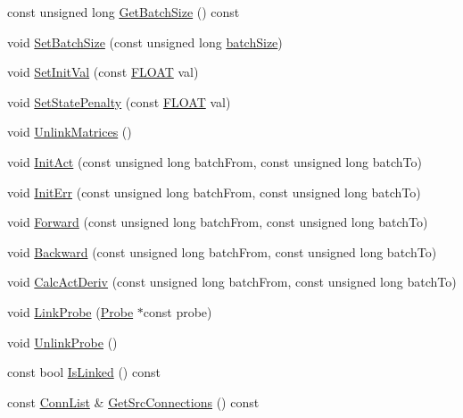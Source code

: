 \begin{DoxyCompactItemize}
\item 
const unsigned long \hyperlink{classfractal_1_1Layer_ad1e9cb194a5ad8ea269857b2f16e001b}{Get\+Batch\+Size} () const 
\item 
void \hyperlink{classfractal_1_1Layer_af2dd6884fc31a42299d200e6c872e67f}{Set\+Batch\+Size} (const unsigned long \hyperlink{classfractal_1_1Layer_ab1bc36200fdb731ad1142d1dc96a6031}{batch\+Size})
\item 
void \hyperlink{classfractal_1_1Layer_a48def7f0cfc273b4b56c52d8d73670b6}{Set\+Init\+Val} (const \hyperlink{namespacefractal_a1c2d2530689575d5ccb56bae52af70d3}{F\+L\+O\+A\+T} val)
\item 
void \hyperlink{classfractal_1_1Layer_a0c698b46cbbf0b8c3cc58605dfcbf21c}{Set\+State\+Penalty} (const \hyperlink{namespacefractal_a1c2d2530689575d5ccb56bae52af70d3}{F\+L\+O\+A\+T} val)
\item 
void \hyperlink{classfractal_1_1Layer_af834c8d49a9c2edffd2652b4ae344aa9}{Unlink\+Matrices} ()
\item 
void \hyperlink{classfractal_1_1Layer_a9e26171500b461c31e56f34debd96796}{Init\+Act} (const unsigned long batch\+From, const unsigned long batch\+To)
\item 
void \hyperlink{classfractal_1_1Layer_a6e7a9753a4995b1774080fa078354125}{Init\+Err} (const unsigned long batch\+From, const unsigned long batch\+To)
\item 
void \hyperlink{classfractal_1_1Layer_a242176b7a427ac0f4e522ca43f311878}{Forward} (const unsigned long batch\+From, const unsigned long batch\+To)
\item 
void \hyperlink{classfractal_1_1Layer_abebbf457abc715017fc0f5813ccfa699}{Backward} (const unsigned long batch\+From, const unsigned long batch\+To)
\item 
void \hyperlink{classfractal_1_1Layer_a4665111b779d272a8b01258625b2116d}{Calc\+Act\+Deriv} (const unsigned long batch\+From, const unsigned long batch\+To)
\item 
void \hyperlink{classfractal_1_1Layer_a506a056312e53b1589f8238df9f6b24b}{Link\+Probe} (\hyperlink{classfractal_1_1Probe}{Probe} $\ast$const probe)
\item 
void \hyperlink{classfractal_1_1Layer_a25ddff557cde6b0e741fdaa71918aedf}{Unlink\+Probe} ()
\item 
const bool \hyperlink{classfractal_1_1Layer_a0582631c535238fac0448fad1b248323}{Is\+Linked} () const 
\item 
const \hyperlink{classfractal_1_1Layer_a112ea548588704c0915a32aa3269b5a6}{Conn\+List} \& \hyperlink{classfractal_1_1Layer_a345e1871562625f4f230f66a2953efa8}{Get\+Src\+Connections} () const 

\end{DoxyCompactItemize}
